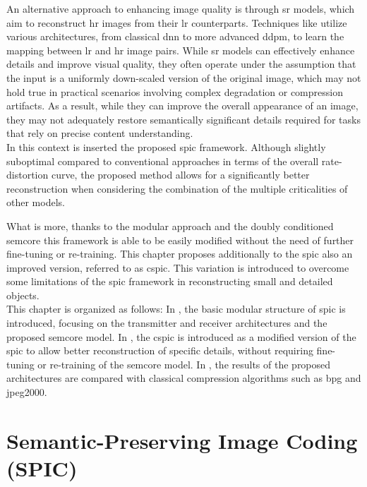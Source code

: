 An alternative approach to enhancing image quality is through \gls{sr} models, which aim to reconstruct \gls{hr} images from their \gls{lr} counterparts. Techniques like \cite{Dong2015SRCNN, Lim2017EDSR, Bruna2016SuperResolution, Rombach2022SR_CVPR} utilize various architectures, from classical \gls{dnn} to more advanced \gls{ddpm}, to learn the mapping between \gls{lr} and \gls{hr} image pairs. While \gls{sr} models can effectively enhance details and improve visual quality, they often  operate under the assumption that the input is a uniformly down-scaled version of the original image, which may not hold true in practical scenarios involving complex degradation or compression artifacts. As a result, while they can improve the overall appearance of an image, they may not adequately restore semantically significant details required for tasks that rely on precise content understanding.\\

 
In this context is inserted the proposed \gls{spic} framework. Although slightly suboptimal compared to conventional approaches in terms of the overall rate-distortion curve, the proposed method allows for a significantly better reconstruction when considering the combination of the multiple criticalities of other models.

What is more, thanks to the modular approach and the doubly conditioned \gls{semcore}  this framework is able to be easily modified without the need of further fine-tuning or re-training. This chapter proposes additionally to the \gls{spic} also an improved version, referred to as \gls{cspic}. This variation is introduced to overcome some limitations of the \gls{spic} framework in reconstructing small and detailed objects.\\

This chapter is organized as follows: In , the basic modular structure of \gls{spic} is introduced, focusing on the transmitter and receiver architectures and the proposed \gls{semcore} model. In , the \gls{cspic} is introduced as a modified version of the \gls{spic} to allow better reconstruction of specific details, without requiring fine-tuning or re-training of the \gls{semcore} model. In , the results of the proposed architectures are compared with classical compression algorithms such as \gls{bpg} and \gls{jpeg2000}.

\section{Semantic-Preserving Image Coding (SPIC)}\label{sec: SPIC spic}

